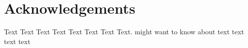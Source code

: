 \section*{Acknowledgements}

Text Text Text Text Text Text  Text Text.  \citealp{Boffelli03} might want to know about  text
text text text
